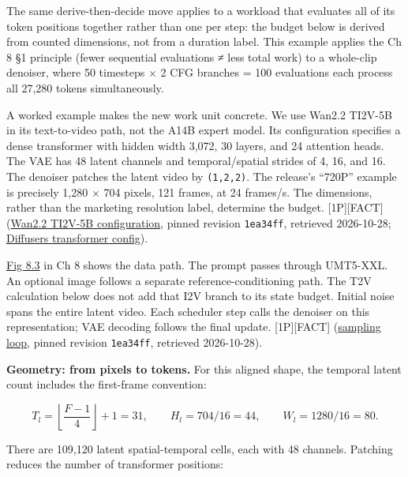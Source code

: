 The same derive-then-decide move applies to a workload that evaluates
all of its token positions together rather than one per step: the budget
below is derived from counted dimensions, not from a duration label.
This example applies the Ch 8 §1 principle (fewer sequential evaluations
≠ less total work) to a whole-clip denoiser, where 50 timesteps × 2 CFG
branches = 100 evaluations each process all 27,280 tokens
simultaneously.

A worked example makes the new work unit concrete. We use Wan2.2 TI2V-5B
in its text-to-video path, not the A14B expert model. Its configuration
specifies a dense transformer with hidden width 3,072, 30 layers, and 24
attention heads. The VAE has 48 latent channels and temporal/spatial
strides of 4, 16, and 16. The denoiser patches the latent video by
\texttt{(1,2,2)}. The release's ``720P'' example is precisely 1,280 ×
704 pixels, 121 frames, at 24 frames/s. The dimensions, rather than the
marketing resolution label, determine the budget. \mbox{{[}1P{]}}\hspace{0pt}\mbox{{[}FACT{]}}
(\href{https://github.com/Wan-Video/Wan2.2/blob/1ea34ff48f87168174e12956e200b1d908b1c5ff/wan/configs/wan_ti2v_5B.py}{Wan2.2
TI2V-5B configuration}, pinned revision \texttt{1ea34ff}, retrieved
2026-10-28;
\href{https://huggingface.co/Wan-AI/Wan2.2-TI2V-5B-Diffusers/blob/main/transformer/config.json}{Diffusers
transformer config}).

\hyperref[fig:8.3]{Fig 8.3} in Ch 8 shows the data path. The prompt passes through UMT5-XXL.
An optional image follows a separate reference-conditioning path. The
T2V calculation below does not add that I2V branch to its state budget.
Initial noise spans the entire latent video. Each scheduler step calls
the denoiser on this representation; VAE decoding follows the final
update. \mbox{{[}1P{]}}\hspace{0pt}\mbox{{[}FACT{]}}
(\href{https://github.com/Wan-Video/Wan2.2/blob/1ea34ff48f87168174e12956e200b1d908b1c5ff/wan/textimage2video.py}{sampling
loop}, pinned revision \texttt{1ea34ff}, retrieved 2026-10-28).

\textbf{Geometry: from pixels to tokens.} For this aligned shape, the
temporal latent count includes the first-frame convention:

\[T_l=\left\lfloor\frac{F-1}{4}\right\rfloor+1=31, \qquad H_l=704/16=44, \qquad W_l=1280/16=80.\]

There are 109,120 latent spatial-temporal cells, each with 48 channels.
Patching reduces the number of transformer positions:


